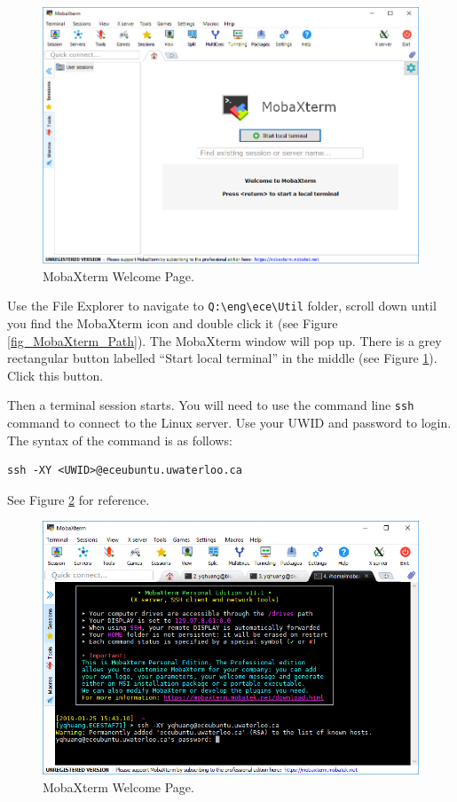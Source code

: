 \begin{figure}[!htb]
  \centering
  \includegraphics[width=6in]{img/lab0/MobaXterm/MobaXterm_Start_Page}
  \caption{MobaXterm Welcome Page.}
  \label{fig_MobaXterm_Start_Page}
\end{figure}

Use the File Explorer to navigate to \verb+Q:\eng\ece\Util+ folder, scroll down until you find the MobaXterm icon and double click it (see Figure \ref{fig_MobaXterm_Path}). The MobaXterm window will pop up. There is a grey rectangular button labelled ``Start local terminal'' in the middle (see Figure \ref{fig_MobaXterm_Start_Page}). Click this button.

Then a terminal session starts. You will need to use the command line \verb+ssh+ command to connect to the Linux server. Use your UWID and password to login. The syntax of the command is as follows:
\begin{lstlisting}[style=bash]
ssh -XY <UWID>@eceubuntu.uwaterloo.ca
\end{lstlisting}
See Figure \ref{fig_MobaXterm_Login_Password} for reference.
\begin{figure}[!htb]
  \centering
  \includegraphics[width=6in]{img/lab0/MobaXterm/MobaXterm_Login_Password}
  \caption{MobaXterm Welcome Page.}
  \label{fig_MobaXterm_Login_Password}
\end{figure}


